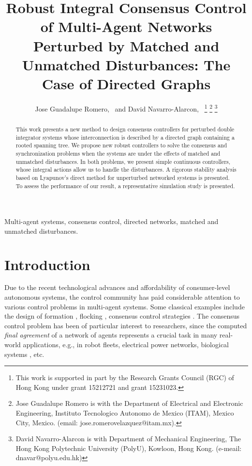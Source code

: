 \documentclass[journal,twoside]{IEEEtran}
\def\lab{\label}
\begin{document}
\title{Robust Integral Consensus Control of Multi-Agent Networks Perturbed by Matched and Unmatched Disturbances: The Case of Directed Graphs}

\author{Jose Guadalupe Romero,~ and David Navarro-Alarcon,~%
\thanks{This work is supported in part by the Research Grants Council (RGC) of Hong Kong under grant 15212721 and grant 15231023.}%
\thanks{Jose Guadalupe Romero is with the Department of Electrical and Electronic Engineering, Instituto Tecnologico Autonomo de Mexico (ITAM), Mexico City, Mexico. (email: jose.romerovelazquez@itam.mx).}
\thanks{David Navarro-Alarcon is with Department of Mechanical Engineering, The Hong Kong Polytechnic University (PolyU), Kowloon, Hong Kong. (e-meail: dnavar@polyu.edu.hk)}
}


\maketitle

\begin{abstract}
This work presents a new method to design consensus controllers for perturbed double integrator systems whose interconnection is described by a directed graph containing a rooted spanning tree. 
We propose new robust controllers to solve the consensus and synchronization problems when the systems are under the effects of matched and unmatched disturbances. 
In both problems, we present simple continuous controllers, whose integral actions allow us to handle the disturbances. 
A rigorous stability analysis based on Lyapunov's direct method for unperturbed networked systems is presented. 
To assess the performance of our result, a representative simulation study is presented.
\end{abstract}

\begin{IEEEkeywords}
				Multi-agent systems, consensus control, directed networks, matched and unmatched disturbances.
\end{IEEEkeywords}
\IEEEpeerreviewmaketitle

\section{Introduction}
\lab{sec1}
Due to the recent technological advances and affordability of consumer-level autonomous systems, the control community has paid considerable attention to various control problems in multi-agent systems. 
Some classical examples include the design of formation \cite{CHEWAN}, flocking \cite{OLF}, consensus control strategies \cite{RENBEA}. 
The consensus control problem has been of particular interest to researchers, since the computed {\it final agreement} of a network of agents represents a crucial task in many real-world applications, e.g., in robot fleets, electrical power networks, biological systems \cite{RENBEARD, MENDIMJOH, FERetal}, etc.
\end{document}
